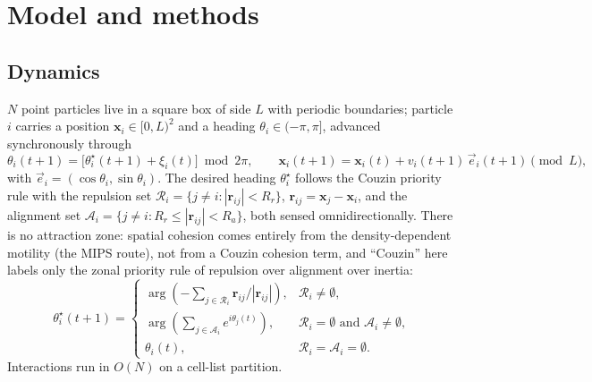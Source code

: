 \documentclass[11pt,a4paper]{article}
\begin{document}
\section{Model and methods}
\label{sec:model}

\subsection{Dynamics}

$N$ point particles live in a square box of side $L$ with
periodic boundaries; particle $i$ carries a position $\mathbf
x_i \in [0, L)^2$ and a heading $\theta_i \in (-\pi, \pi]$,
advanced synchronously through
\begin{equation}
\theta_i(t+1) = \bigl[\theta_i^\star(t+1) + \xi_i(t)\bigr]
   \bmod 2\pi,
\qquad
\mathbf x_i(t+1) = \mathbf x_i(t) + v_i(t+1)\,\vec e_i(t+1)
   \pmod L,
\label{eq:update}
\end{equation}
with $\vec e_i = (\cos\theta_i, \sin\theta_i)$. The desired
heading $\theta_i^\star$ follows the Couzin priority rule
\citep{Couzin2002} with the repulsion set $\mathcal R_i =
\{j \neq i : |\mathbf r_{ij}| < R_r\}$,
$\mathbf r_{ij} = \mathbf x_j - \mathbf x_i$, and the
alignment set $\mathcal A_i = \{j \neq i : R_r \le
|\mathbf r_{ij}| < R_a\}$, both sensed omnidirectionally.
There is no attraction zone: spatial cohesion comes
entirely from the density-dependent motility (the MIPS
route), not from a Couzin cohesion term, and ``Couzin'' here
labels only the zonal priority rule of repulsion over alignment
over inertia:
\begin{equation}
\theta_i^\star(t+1) =
\begin{cases}
\arg\!\left(-\sum_{j \in \mathcal R_i}
   \mathbf r_{ij} / |\mathbf r_{ij}|\right),
   & \mathcal R_i \neq \emptyset, \\[4pt]
\arg\!\left(\sum_{j \in \mathcal A_i} e^{i\theta_j(t)}\right),
   & \mathcal R_i = \emptyset
   \text{ and } \mathcal A_i \neq \emptyset, \\[4pt]
\theta_i(t),
   & \mathcal R_i = \mathcal A_i = \emptyset.
\end{cases}
\label{eq:theta_star}
\end{equation}
Interactions run in $O(N)$ on a cell-list partition.
\end{document}
